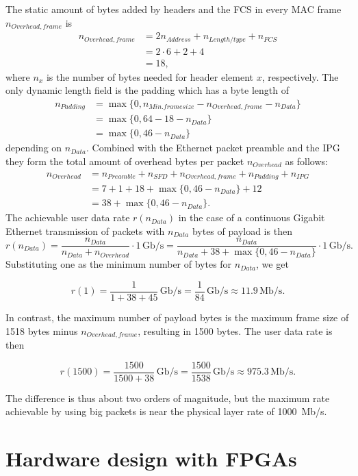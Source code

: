\documentclass[a4paper, 11pt, oneside]{Thesis}  %
\begin{document}
The static amount of bytes added by headers and the FCS in every MAC frame $n_{Overhead,frame}$ is
\begin{align*}
n_{Overhead,frame} &= 2 n_{Address}+n_{Length/type}+n_{FCS} \\
&= 2 \cdot 6 + 2 + 4 \\
&= 18,
\end{align*}
where $n_{x}$ is the number of bytes needed for header element $x$, respectively. The only dynamic length field is the padding which has a byte length of
\begin{align*}
n_{Padding} &=\max\{0,n_{Min.framesize}-n_{Overhead,frame}-n_{Data}\} \\
&= \max\{0,64-18-n_{Data}\} \\
&= \max\{0,46-n_{Data}\}
\end{align*}
depending on $n_{Data}$. Combined with the Ethernet packet preamble and the IPG they form the total amount of overhead bytes per packet $n_{Overhead}$ as follows:
\begin{align*}
n_{Overhead} &= n_{Preamble}+n_{SFD}+n_{Overhead,frame}+n_{Padding}+n_{IPG} \\
&= 7 +1 + 18+ \max\{0,46-n_{Data}\}+12 \\
&= 38+ \max\{0,46-n_{Data}\}.
\end{align*}
The achievable user data rate $r(n_{Data})$ in the case of a continuous Gigabit Ethernet transmission of packets with $n_{Data}$ bytes of payload is then
\[ r(n_{Data}) = \frac{n_{Data}}{n_{Data}+n_{Overhead}}\cdot 1\, \mathrm{Gb/s} = \frac{n_{Data}}{n_{Data}+38+ \max\{0,46-n_{Data}\}} \cdot 1\, \mathrm{Gb/s}. \]
Substituting one as the minimum number of bytes for $n_{Data}$, we get

\[ r(1) = \frac{1}{1+38+45}\, \mathrm{Gb/s} = \frac{1}{84}\,\mathrm{Gb/s} \approx 11.9 \,\mathrm{Mb/s}. \]

In contrast, the maximum number of payload bytes is the maximum frame size of 1518 bytes minus $n_{Overhead,frame}$, resulting in 1500 bytes. The user data rate is then

\[r(1500) = \frac{1500}{1500+38}\, \mathrm{Gb/s} = \frac{1500}{1538}\,\mathrm{Gb/s} \approx 975.3\,\mathrm{Mb/s}.\]

The difference is thus about two orders of magnitude, but the maximum rate achievable by using big packets is near the physical layer rate of 1000~Mb/s.
\section{Hardware design with FPGAs}\label{ch:fpgas}
\end{document}

